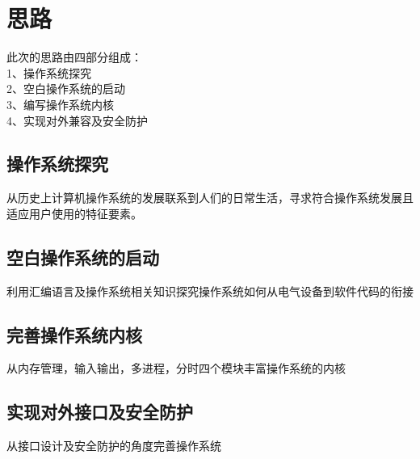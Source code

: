 \chapter{思路}

此次的思路由四部分组成：\\
\hspace*{1.5cm}1、操作系统探究 \\
\hspace*{1.5cm}2、空白操作系统的启动 \\
\hspace*{1.5cm}3、编写操作系统内核 \\
\hspace*{1.5cm}4、实现对外兼容及安全防护

\section{操作系统探究}
从历史上计算机操作系统的发展联系到人们的日常生活，寻求符合操作系统发展且适应用户使用的特征要素。

\section{空白操作系统的启动}
利用汇编语言及操作系统相关知识探究操作系统如何从电气设备到软件代码的衔接

\section{完善操作系统内核}
从内存管理，输入输出，多进程，分时四个模块丰富操作系统的内核

\section{实现对外接口及安全防护}
从接口设计及安全防护的角度完善操作系统